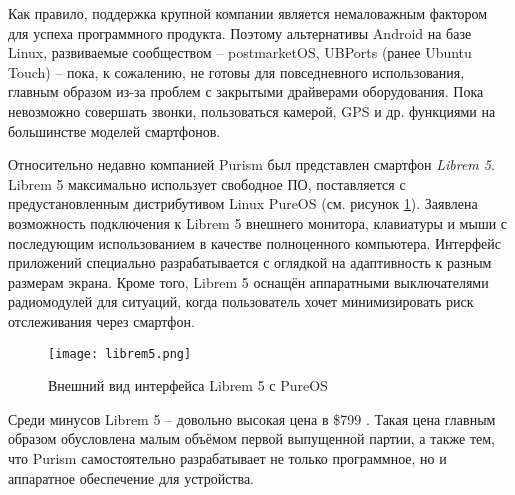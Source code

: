 Как правило, поддержка крупной компании является немаловажным фактором для успеха программного продукта.
Поэтому альтернативы Android на базе Linux, развиваемые сообществом -- postmarketOS, UBPorts (ранее Ubuntu Touch) -- пока, к сожалению, не готовы для повседневного использования, главным образом из-за проблем с закрытыми драйверами оборудования.
Пока невозможно совершать звонки, пользоваться камерой, GPS и др. функциями на большинстве моделей смартфонов.

Относительно недавно компанией Purism был представлен смартфон \textit{Librem 5}.
Librem 5 максимально использует свободное ПО, поставляется с предустановленным дистрибутивом Linux PureOS (см. рисунок \ref{fig:librem5}).
Заявлена возможность подключения к Librem 5 внешнего монитора, клавиатуры и мыши с последующим использованием в качестве полноценного компьютера.
Интерфейс приложений специально разрабатывается с оглядкой на адаптивность к разным размерам экрана.
Кроме того, Librem 5 оснащён аппаратными выключателями радиомодулей для ситуаций, когда пользователь хочет минимизировать риск отслеживания через смартфон.

\begin{figure}[ht]
    \centering
    \texttt{[image: librem5.png]}  
    \caption{Внешний вид интерфейса Librem 5 с PureOS}
	\label{fig:librem5}
\end{figure}

Среди минусов Librem 5 -- довольно высокая цена в \$799 \cite{librem5}.
Такая цена главным образом обусловлена малым объёмом первой выпущенной партии, а также тем, что Purism самостоятельно разрабатывает не только программное, но и аппаратное обеспечение для устройства.
